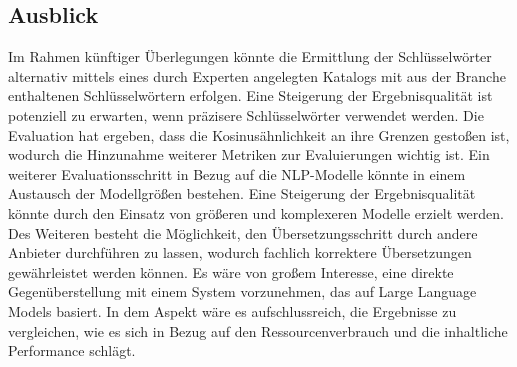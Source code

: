 







\subsection*{Ausblick}
Im Rahmen künftiger Überlegungen könnte die Ermittlung der Schlüsselwörter alternativ mittels eines durch Experten angelegten Katalogs mit aus der Branche enthaltenen Schlüsselwörtern erfolgen. Eine Steigerung der Ergebnisqualität ist potenziell zu erwarten, wenn präzisere Schlüsselwörter verwendet werden. Die Evaluation hat ergeben, dass die Kosinusähnlichkeit an ihre Grenzen gestoßen ist, wodurch die Hinzunahme weiterer Metriken zur Evaluierungen wichtig ist. Ein weiterer Evaluationsschritt in Bezug auf die NLP-Modelle könnte in einem Austausch der Modellgrößen bestehen. Eine Steigerung der Ergebnisqualität könnte durch den Einsatz von größeren und komplexeren Modelle erzielt werden. Des Weiteren besteht die Möglichkeit, den Übersetzungsschritt durch andere Anbieter durchführen zu lassen, wodurch fachlich korrektere Übersetzungen gewährleistet werden können. Es wäre von großem Interesse, eine direkte Gegenüberstellung mit einem System vorzunehmen, das auf Large Language Models basiert. In dem Aspekt wäre es aufschlussreich, die Ergebnisse zu vergleichen, wie es sich in Bezug auf den Ressourcenverbrauch und die inhaltliche Performance schlägt.
\newpage
